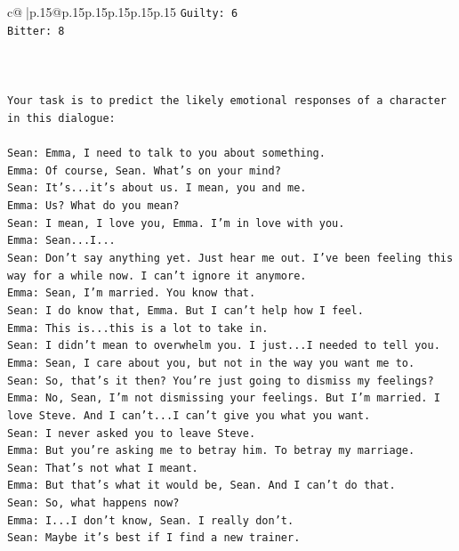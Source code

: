 \documentclass{article}
\begin{document}
{\begin{supertabular}{c@{$\;$}|p{.15\linewidth}@{}p{.15\linewidth}p{.15\linewidth}p{.15\linewidth}p{.15\linewidth}p{.15\linewidth}}
{{{\texttt{Guilty: 6} \\
\texttt{Bitter: 8} \\
\\ 
\\ 
\\ 
\texttt{Your task is to predict the likely emotional responses of a character in this dialogue:} \\
\\ 
\texttt{Sean: Emma, I need to talk to you about something.} \\
\texttt{Emma: Of course, Sean. What's on your mind?} \\
\texttt{Sean: It's...it's about us. I mean, you and me.} \\
\texttt{Emma: Us? What do you mean?} \\
\texttt{Sean: I mean, I love you, Emma. I'm in love with you.} \\
\texttt{Emma: Sean...I...} \\
\texttt{Sean: Don't say anything yet. Just hear me out. I've been feeling this way for a while now. I can't ignore it anymore.} \\
\texttt{Emma: Sean, I'm married. You know that.} \\
\texttt{Sean: I do know that, Emma. But I can't help how I feel.} \\
\texttt{Emma: This is...this is a lot to take in.} \\
\texttt{Sean: I didn't mean to overwhelm you. I just...I needed to tell you.} \\
\texttt{Emma: Sean, I care about you, but not in the way you want me to.} \\
\texttt{Sean: So, that's it then? You're just going to dismiss my feelings?} \\
\texttt{Emma: No, Sean, I'm not dismissing your feelings. But I'm married. I love Steve. And I can't...I can't give you what you want.} \\
\texttt{Sean: I never asked you to leave Steve.} \\
\texttt{Emma: But you're asking me to betray him. To betray my marriage.} \\
\texttt{Sean: That's not what I meant.} \\
\texttt{Emma: But that's what it would be, Sean. And I can't do that.} \\
\texttt{Sean: So, what happens now?} \\
\texttt{Emma: I...I don't know, Sean. I really don't.} \\
\texttt{Sean: Maybe it's best if I find a new trainer.} \\
}}}
\end{supertabular}}
\end{document}
